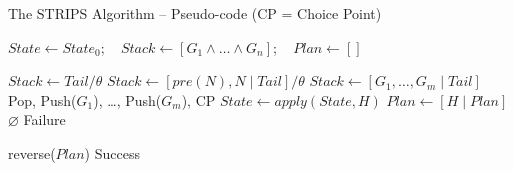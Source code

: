 \documentclass[presentation]{beamer}\mode<presentation>{\usetheme{AMSBolognaFC}}
\begin{document}
\begin{frame}[c]{The STRIPS Algorithm -- Pseudo-code \hfill {\scriptsize(CP = Choice Point)}}

        \begin{algorithmic}\small

                \State $State \leftarrow State_0$; ~ $Stack \leftarrow [G_1 \wedge \dots \wedge G_n]$; ~ $Plan \leftarrow []$

                \State

                 
                        \State $Stack \leftarrow Tail / \theta$ 
                     
                        \State $Stack \leftarrow [pre(N), N \mid Tail] / \theta$  
                        \State $Stack \leftarrow [G_1, \ldots, G_m \mid Tail]$ \Comment Pop, Push($G_1$), \ldots, Push($G_m$), \alert{CP}
                        \State $State \leftarrow apply(State, H)$
                        \State $Plan \leftarrow [H \mid Plan]$
                    \Else
                        \State \Return $\varnothing$ \Comment Failure
                    \EndIf
                \EndWhile

                \State

                \State \Return reverse($Plan$) \Comment Success
            \EndFunction
        \end{algorithmic}

\end{frame}
\end{document}
